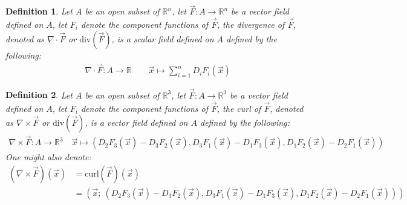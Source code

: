\documentclass[15pt]{book}
\theoremstyle{break}
\theoremstyle{break}
\newtheorem{defn}{Definition}[corL]
\newcommand{\R}{\mathbb{R}}
\begin{document}
\begin{defn}
Let $A$ be an open subset of $\R^n$, let $\vec{F}:A \to \R^n$ be a vector field defined on $A$, let $F_i$ denote the component functions of $\vec{F}$, the divergence of $\vec{F}$, denoted as $\nabla \cdot \vec{F}$ or $\text{div}(\vec{F})$, is a scalar field defined on $A$ defined by the following:
\begin{align*}
\nabla \cdot \vec{F} :A \to \R \qquad \vec{x}\mapsto \sum_{i=1}^n D_iF_i(\vec{x})
\end{align*}
\end{defn}

\begin{defn}
Let $A$ be an open subset of $\R^3$, let $\vec{F}:A \to \R^3$ be a vector field defined on $A$, let $F_i$ denote the component functions of $\vec{F}$, the curl of $\vec{F}$, denoted as $\nabla \times \vec{F}$ or $\text{div}(\vec{F})$, is a vector field defined on $A$ defined by the following:
\begin{align*}
\nabla \times \vec{F} :A \to \R^3 \quad \vec{x}\mapsto(D_2F_3(\vec{x}) - D_3F_2(\vec{x}), D_3F_1(\vec{x}) - D_1F_3(\vec{x}), D_1F_2(\vec{x}) - D_2F_1(\vec{x}))
\end{align*}
One might also denote:
\begin{align*}
(\nabla \times \vec{F})(\vec{x}) 
&= \text{curl}(\vec{F})(\vec{x}) \\
&= (\vec{x}; \ (D_2F_3(\vec{x}) - D_3F_2(\vec{x}), D_3F_1(\vec{x}) - D_1F_3(\vec{x}), D_1F_2(\vec{x}) - D_2F_1(\vec{x})))
\end{align*}
\end{defn}
\end{document}
